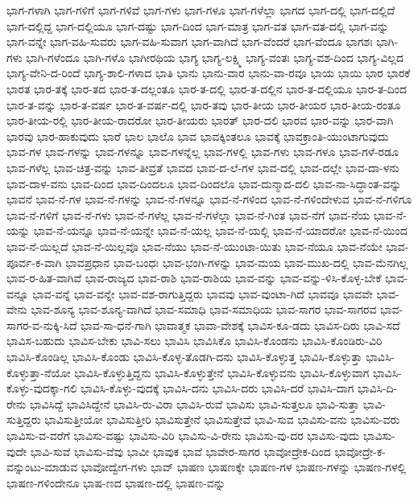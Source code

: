 {ಭಾಗ-ಗಳಾಗಿ
ಭಾಗ-ಗಳಿಗೆ
ಭಾಗ-ಗಳಿವೆ
ಭಾಗ-ಗಳು
ಭಾಗ-ಗಳೂ
ಭಾಗ-ಗಳೆಲ್ಲಾ
ಭಾಗದ
ಭಾಗ-ದಲ್ಲಿ
ಭಾಗ-ದಲ್ಲಿದೆ
ಭಾಗ-ದಲ್ಲಿದ್ದ
ಭಾಗ-ದಲ್ಲಿಯೂ
ಭಾಗ-ದಷ್ಟು
ಭಾಗ-ದಿಂದ
ಭಾಗ-ಮಾತ್ರ
ಭಾಗ-ವತ
ಭಾಗ-ವತ-ದಲ್ಲಿ
ಭಾಗ-ವನ್ನು
ಭಾಗ-ವನ್ನೇ
ಭಾಗ-ವಹಿ-ಸುವರು
ಭಾಗ-ವಹಿ-ಸುವಾಗ
ಭಾಗ-ವಾಗಿದೆ
ಭಾಗ-ವೆಂದರೆ
ಭಾಗ-ವೆಂದೂ
ಭಾಗಶಃ
ಭಾಗಿ-ಗಳು
ಭಾಗಿ-ಗಳೆಂದೂ
ಭಾಗಿ-ಗಳೊ
ಭಾಗೀರಥಿಯ
ಭಾಗ್ಯ
ಭಾಗ್ಯ-ಲಕ್ಷ್ಮಿ
ಭಾಗ್ಯ-ವಂತಃ
ಭಾಗ್ಯ-ವಶ-ದಿಂದ
ಭಾಗ್ಯ-ವಿಲ್ಲದ
ಭಾಗ್ಯ-ವೇನಿ-ದ-ರಿಂದೆ
ಭಾಗ್ಯ-ಶಾಲಿ-ಗಳಾದ
ಭಾತಿ
ಭಾನು
ಭಾನು-ವಾರ
ಭಾನು-ವಾ-ರವೂ
ಭಾಯ
ಭಾಯಿ
ಭಾರ
ಭಾರಕೆ
ಭಾರತ
ಭಾರ-ತಕ್ಕೆ
ಭಾರ-ತದ
ಭಾರ-ತ-ದಲ್ಲಂತೂ
ಭಾರ-ತ-ದಲ್ಲಿ
ಭಾರ-ತ-ದಲ್ಲಿನ
ಭಾರ-ತ-ದಲ್ಲಿಯೂ
ಭಾರ-ತ-ದಿಂದ
ಭಾರ-ತ-ವನ್ನು
ಭಾರ-ತ-ವರ್ಷ
ಭಾರ-ತ-ವರ್ಷ-ದಲ್ಲಿ
ಭಾರ-ತವು
ಭಾರ-ತೀಯ
ಭಾರ-ತೀಯರ
ಭಾರ-ತೀಯ-ರಂತೂ
ಭಾರ-ತೀಯ-ರಲ್ಲಿ
ಭಾರ-ತೀಯ-ರಾದರೋ
ಭಾರ-ತೀಯರು
ಭಾರತ್
ಭಾರ-ದಲಿ
ಭಾರವ
ಭಾರ-ವನ್ನು
ಭಾರ-ವಾಗಿ
ಭಾರವು
ಭಾರ-ಹಾಕುವುದು
ಭಾರೆ
ಭಾಲ
ಭಾಲೊ
ಭಾವ
ಭಾವಕ್ಕಿಂತಲೂ
ಭಾವಕ್ಕೆ
ಭಾವಕ್ರಾಂತಿ-ಯುಂಟಾಗುವುದು
ಭಾವ-ಗಳ
ಭಾವ-ಗಳನ್ನು
ಭಾವ-ಗಳನ್ನೂ
ಭಾವ-ಗಳನ್ನೆಲ್ಲ
ಭಾವ-ಗಳಲ್ಲಿ
ಭಾವ-ಗಳು
ಭಾವ-ಗಳೂ
ಭಾವ-ಗಳೆ-ರಡೂ
ಭಾವ-ಗಳೆಲ್ಲ
ಭಾವ-ಚಿತ್ರ-ವನ್ನು
ಭಾವ-ತೀವ್ರತೆ
ಭಾವದ
ಭಾವ-ದ-ಲೆ-ಗಳ
ಭಾವ-ದಲ್ಲಿ
ಭಾವ-ದಲ್ಲೇ
ಭಾವ-ದಾ-ಳನು
ಭಾವ-ದಾಳ-ವನು
ಭಾವ-ದಿಂದ
ಭಾವ-ದಿಂದಲೂ
ಭಾವ-ದಿಂದಲೊ
ಭಾವ-ದುನ್ಮಾದ-ದಲಿ
ಭಾವ-ನಾ-ಸಿದ್ಧಾಂತ-ವನ್ನು
ಭಾವನೆ
ಭಾವ-ನೆ-ಗಳ
ಭಾವ-ನೆ-ಗಳನ್ನು
ಭಾವ-ನೆ-ಗಳನ್ನೂ
ಭಾವ-ನೆ-ಗಳಿಂದ
ಭಾವ-ನೆ-ಗಳಿಂದೇಳುವ
ಭಾವ-ನೆ-ಗಳಿಗೂ
ಭಾವ-ನೆ-ಗಳಿಗೆ
ಭಾವ-ನೆ-ಗಳು
ಭಾವ-ನೆ-ಗಳೆಲ್ಲ
ಭಾವ-ನೆ-ಗಳೆಲ್ಲಾ
ಭಾವ-ನೆ-ಗಿಂತ
ಭಾವ-ನೆಗೆ
ಭಾವ-ನೆಯ
ಭಾವ-ನೆ-ಯನ್ನು
ಭಾವ-ನೆ-ಯನ್ನೂ
ಭಾವ-ನೆ-ಯನ್ನೇ
ಭಾವ-ನೆ-ಯಲ್ಲ
ಭಾವ-ನೆ-ಯಲ್ಲಿ
ಭಾವ-ನೆ-ಯಾದರೋ
ಭಾವ-ನೆ-ಯಿಂದ
ಭಾವ-ನೆ-ಯಿಲ್ಲದೆ
ಭಾವ-ನೆ-ಯಿಲ್ಲವೊ
ಭಾವ-ನೆಯು
ಭಾವ-ನೆ-ಯುಂಟಾ-ಯಿತು
ಭಾವ-ನೆಯೂ
ಭಾವ-ನೆಯೇ
ಭಾವ-ಪೂರ್ವ-ಕ-ವಾಗಿ
ಭಾವಪ್ರಧಾನ
ಭಾವ-ಬಂಧಃ
ಭಾವ-ಭಂಗಿ-ಗಳನ್ನು
ಭಾವ-ಮಯ
ಭಾವ-ಮುಖ-ದಲ್ಲಿ
ಭಾವ-ಮೆನಗಿಲ್ಲ
ಭಾವ-ರ-ಹಿತ-ವಾಗಿವೆ
ಭಾವ-ರಾಜ್ಯದ
ಭಾವ-ರಾಶಿ
ಭಾವ-ರಾಶಿಯ
ಭಾವ-ವನ್ನು
ಭಾವ-ವನ್ನು-ಳಿಸಿ-ಕೊಳ್ಳ-ಬೇಕೆ
ಭಾವ-ವನ್ನೂ
ಭಾವ-ವನ್ನೆ
ಭಾವ-ವನ್ನೇ
ಭಾವ-ವಶ-ರಾಗುತ್ತಿದ್ದರು
ಭಾವವು
ಭಾವ-ವುಂಟಾ-ಗಿದೆ
ಭಾವವೂ
ಭಾವವೇ
ಭಾವ-ವೇನು
ಭಾವ-ಶೂನ್ಯ
ಭಾವ-ಶೂನ್ಯ-ವಾಗಿದೆ
ಭಾವ-ಸಮಾಧಿ
ಭಾವ-ಸಮಾಧಿಯ
ಭಾವ-ಸಾಗರ
ಭಾವ-ಸಾಗರವ
ಭಾವ-ಸಾಗರ-ವ-ನುಕ್ಕಿ-ಸಿದೆ
ಭಾವ-ಸಾ-ಧನೆ-ಗಾಗಿ
ಭಾವಾತ್ಮಕ
ಭಾವಾ-ವೇಶಕ್ಕೆ
ಭಾವಿಸ-ಕೂ-ಡದು
ಭಾವಿಸ-ದಿರು
ಭಾವಿ-ಸದೆ
ಭಾವಿಸ-ಬಹುದು
ಭಾವಿಸ-ಬೇಕು
ಭಾವಿ-ಸಲು
ಭಾವಿಸಿ
ಭಾವಿಸಿಕೊ
ಭಾವಿಸಿ-ಕೊಂಡನು
ಭಾವಿಸಿ-ಕೊಂಡಿರು-ವಿರಿ
ಭಾವಿಸಿ-ಕೊಂಡಿಲ್ಲ
ಭಾವಿಸಿ-ಕೊಂಡು
ಭಾವಿಸಿ-ಕೊಳ್ಳ-ತೊಡಗಿ-ದನು
ಭಾವಿಸಿ-ಕೊಳ್ಳುತ್ತ
ಭಾವಿಸಿ-ಕೊಳ್ಳುತ್ತಾ
ಭಾವಿಸಿ-ಕೊಳ್ಳುತ್ತಾ-ನೆಯೋ
ಭಾವಿಸಿ-ಕೊಳ್ಳುತ್ತಿದ್ದನು
ಭಾವಿಸಿ-ಕೊಳ್ಳುತ್ತೇನೆ
ಭಾವಿಸಿ-ಕೊಳ್ಳುವನು
ಭಾವಿಸಿ-ಕೊಳ್ಳುವಾಗ
ಭಾವಿಸಿ-ಕೊಳ್ಳು-ವುದಕ್ಕಾ-ಗಲಿ
ಭಾವಿಸಿ-ಕೊಳ್ಳು-ವುದಕ್ಕೆ
ಭಾವಿಸಿ-ದನು
ಭಾವಿಸಿ-ದರು
ಭಾವಿಸಿ-ದರೆ
ಭಾವಿಸಿ-ದಾಗ
ಭಾವಿಸಿ-ದಿ-ರೇನು
ಭಾವಿಸಿದ್ದೆ
ಭಾವಿಸಿದ್ದೇನೆ
ಭಾವಿಸಿ-ರು-ವಿರಾ
ಭಾವಿಸಿ-ರುವೆ
ಭಾವಿಸು
ಭಾವಿ-ಸುತ್ತಲೂ
ಭಾವಿ-ಸುತ್ತಾ
ಭಾವಿ-ಸುತ್ತಿದ್ದರು
ಭಾವಿಸುತ್ತೀಯೋ
ಭಾವಿಸುತ್ತೀರಿ
ಭಾವಿಸುತ್ತೇನೆ
ಭಾವಿಸುತ್ತೇವೆ
ಭಾವಿ-ಸುವ
ಭಾವಿಸು-ವನು
ಭಾವಿಸು-ವರು
ಭಾವಿಸು-ವ-ವರೆಗೆ
ಭಾವಿಸು-ವಷ್ಟು
ಭಾವಿಸು-ವಿರಿ
ಭಾವಿಸು-ವಿ-ರೇನು
ಭಾವಿಸು-ವು-ದರ
ಭಾವಿಸು-ವುದು
ಭಾವಿಸು-ವುದೇ
ಭಾವಿ-ಸುವೆ
ಭಾವಿಸು-ವೆವು
ಭಾವೀ
ಭಾವುಕ
ಭಾವೆ
ಭಾವೇರ-ಸಾಗರ
ಭಾವೋದ್ರೇಕ-ದಿಂದ
ಭಾವೋದ್ರೇ-ಕ-ವನ್ನುಂಟು-ಮಾಡುವ
ಭಾವೋದ್ವೇಗ-ಗಳು
ಭಾವ್
ಭಾಷಣ
ಭಾಷಣಕ್ಕೇ
ಭಾಷಣ-ಗಳ
ಭಾಷಣ-ಗಳನ್ನು
ಭಾಷಣ-ಗಳಲ್ಲಿ
ಭಾಷಣ-ಗಳಿಂದೇನೂ
ಭಾಷ-ಣದ
ಭಾಷಣ-ದಲ್ಲಿ
ಭಾಷಣ-ವನ್ನು
}
